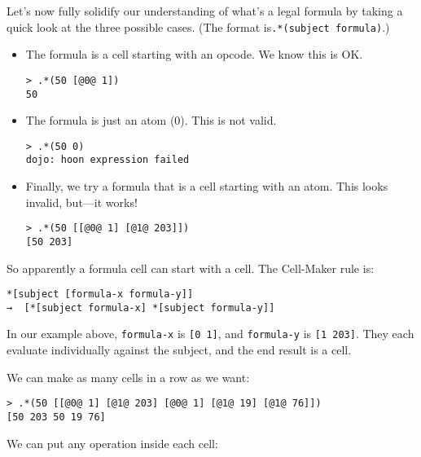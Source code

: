 \documentclass[twoside]{article}
\begin{document}
Let's now fully solidify our understanding of what's a legal formula by taking a quick look at the three possible cases. (The format is\lstinline[style=inlinecode]{.*(subject formula)}.)

\begin{itemize}

  \item  The formula is a cell starting with an opcode.  We know this is OK.

\begin{lstlisting}[style=listingcode]
> .*(50 [@0@ 1])
50
\end{lstlisting}

  \item  The formula is just an atom (0).  This is not valid.

\begin{lstlisting}[style=listingcode]
> .*(50 0)
dojo: hoon expression failed
\end{lstlisting}

  \item  Finally, we try a formula that is a cell starting with an atom.  This looks invalid, but—it works!

\begin{lstlisting}[style=listingcode]
> .*(50 [[@0@ 1] [@1@ 203]])
[50 203]
\end{lstlisting}

\end{itemize}

So apparently a formula cell can start with a cell. The Cell-Maker rule is:

\begin{lstlisting}[style=listingcode]
*[subject [formula-x formula-y]]
→  [*[subject formula-x] *[subject formula-y]]
\end{lstlisting}

In our example above, \lstinline[style=inlinecode]{formula-x} is \lstinline[style=inlinecode]{[0 1]}, and \lstinline[style=inlinecode]{formula-y} is \lstinline[style=inlinecode]{[1 203]}. They each evaluate individually against the subject, and the end result is a cell.

We can make as many cells in a row as we want:

\begin{lstlisting}[style=listingcode]
> .*(50 [[@0@ 1] [@1@ 203] [@0@ 1] [@1@ 19] [@1@ 76]])
[50 203 50 19 76]
\end{lstlisting}

We can put any operation inside each cell:
\end{document}

